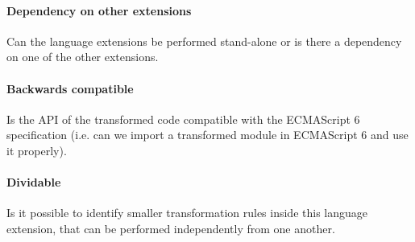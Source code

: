 \paragraph{Dependency on other extensions}
Can the language extensions be performed stand-alone or is there a dependency on one of the other extensions.

\paragraph{Backwards compatible}
Is the API of the transformed code compatible with the ECMAScript 6 specification (i.e. can we import a transformed module in ECMAScript 6 and use it properly).

\paragraph{Dividable}
Is it possible to identify smaller transformation rules inside this language extension, that can be performed independently from one another.

